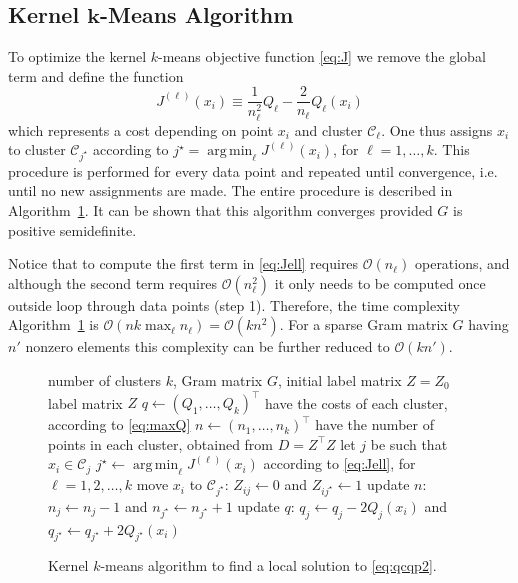 \documentclass[aps,preprint,nofootinbib,floatfix]{revtex4-1}
\DeclareMathOperator*{\argmin}{arg\,min}
\newcommand\C{{\mathcal{C}}}
\newcommand\OO{{\mathcal{O}}}
\begin{document}
\subsection*{Kernel $\bm{k}$-Means Algorithm}

To optimize the kernel $k$-means objective function
\eqref{eq:J} we remove the global term and define the function
\begin{equation}
\label{eq:Jell}
J^{(\ell)}(x_i) \equiv 
\dfrac{1}{n_\ell^2} Q_\ell
-\dfrac{2}{n_\ell} Q_\ell(x_i) 
\end{equation}
which represents a cost depending on point $x_i$ and cluster $\C_\ell$. One
thus assigns  $x_i$ to cluster $\C_{j^\star}$ according
to $j^\star = \argmin_\ell J^{(\ell)}(x_i)$, for $\ell = 1,\dotsc,k$.
This procedure is performed for every data point and repeated until
convergence, i.e. until no new assignments are made.
The entire procedure is described in Algorithm~\ref{kmeans_algo}.
It can be shown that this algorithm converges provided $G$ is positive
semidefinite.

Notice that to compute the first term in \eqref{eq:Jell} requires
$\OO(n_\ell)$ operations, and although the second term requires
$\OO(n_\ell^2)$ it only needs to be computed once outside loop through
data points (step 1).
Therefore, the time complexity Algorithm~\ref{kmeans_algo} is
$\OO(n k \max_\ell n_\ell) = \OO(k n^2)$. For a sparse
Gram matrix $G$ having
$n'$ nonzero elements this complexity can be further reduced
to $\OO(k n')$. 

\begin{figure}
\begin{algorithm}[H]
\vspace{.5em}
\begin{algorithmic}[1]
    \INPUT number of clusters $k$, Gram matrix $G$, initial label
    matrix $Z = Z_0$
    \OUTPUT label matrix $Z$ 
  \STATE $q \leftarrow (Q_1, \dotsc, Q_k)^\top$ 
            have the costs of each cluster, according to \eqref{eq:maxQ}
  \STATE $n \leftarrow (n_1,\dotsc,n_k)^\top$ 
        have the number of points in each cluster, obtained 
        from $D = Z^\top Z$
  \REPEAT
        \STATE let $j$ be such that $x_i \in \C_j$
        \STATE $j^\star \leftarrow \argmin_{\ell} J^{(\ell)}(x_i)$
            according to \eqref{eq:Jell}, for $\ell=1,2,\dots,k$
            \STATE move $x_i$ to $\C_{j^\star}$: $Z_{ij} \leftarrow 0$ and
            $Z_{ij^\star} \leftarrow 1$
            \STATE update $n$: $n_j \leftarrow n_j - 1$ and
                    $n_{j^\star} \leftarrow n_{j^\star} + 1$
            \STATE update $q$: $q_j \leftarrow q_j - 2Q_j(x_i)$ and
    $q_{j^\star} \leftarrow q_{j^\star} + 2Q_{j^\star}(x_i)$
        \ENDIF
    \ENDFOR
\end{algorithmic}
\caption{\label{kmeans_algo}
Kernel $k$-means algorithm 
to find a local solution to \eqref{eq:qcqp2}.
\hspace{\fill}
}
\end{algorithm}
\end{figure}
\end{document}
